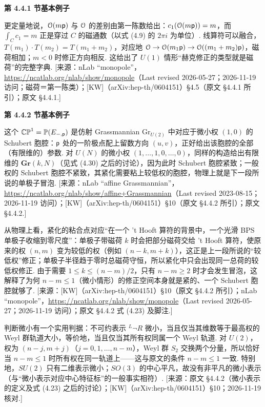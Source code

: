 \medskip\noindent\textbf{第 4.4.1 节\quad 基本例子}\par\nopagebreak
\begin{description}[leftmargin=5.8em,labelwidth=5em,labelsep=0.6em,itemsep=0.15ex,topsep=0.2ex]
\item[4.4.1-1] 更定量地说，${\mathcal O}(m{\sf p})$ 与 ${\mathcal O}$ 的差别由第一陈数给出：$c_1({\mathcal O}(m{\sf p}))=m$，而 $\int_C c_1=m$ 正是穿过 $C$ 的磁通数（以式 (4.9) 的 $2\pi i$ 为单位）. 线算符可以融合，$T(m_1)\cdot T(m_2)=T(m_1+m_2)$，对应地 ${\mathcal O}\to{\mathcal O}(m_1{\sf p})\to{\mathcal O}((m_1+m_2){\sf p})$，磁荷相加；$m<0$ 时修正方向相反. 这给出了 $U(1)$ 情形“赫克修正的类型就是磁荷”的完整字典. [来源：nLab “monopole”，\url{https://ncatlab.org/nlab/show/monopole}（Last revised 2026-05-27；2026-11-19 访问；磁荷＝第一陈类）；[KW]（arXiv:hep-th/0604151）§4.5（原文 §4.4.1 所引）；原文 §4.4.1.]
\end{description}
\medskip\noindent\textbf{第 4.4.2 节\quad 基本例子}\par\nopagebreak
\begin{description}[leftmargin=5.8em,labelwidth=5em,labelsep=0.6em,itemsep=0.15ex,topsep=0.2ex]
\item[4.4.2-1] 这个 ${\mathbb{CP}}^1=\mathbb P(E_{-,{\sf p}})$ 是仿射 Grassmannian $\mathrm{Gr}_{U(2)}$ 中对应于微小权 $(1,0)$ 的 Schubert 胞腔：${\sf p}$ 处的一阶极点配上留数方向 $(u,v)$，正好给出该胞腔的全部（有限维的）参数. 对 $U(N)$ 的微小权 $(1,\dots,1,0,\dots,0)$，同样的构造给出有限维的 $\mathbf{Gr}(k,N)$（见式 (4.30) 之后的讨论），因为此时 Schubert 胞腔紧致；一般权的 Schubert 胞腔不紧致，其紧化需要粘上较低权的胞腔，物理上就是下一段所说的单极子冒泡. [来源：nLab “affine Grassmannian”，\url{https://ncatlab.org/nlab/show/affine+Grassmannian}（Last revised 2023-08-15；2026-11-19 访问）；[KW]（arXiv:hep-th/0604151）§10（原文 §4.4.2 所引）；原文 §4.4.2.]
\item[4.4.2-2] 从物理上看，紧化的粘合点对应“在一个 't Hooft 算符的背景中，一个光滑 BPS 单极子收缩到零尺度”：单极子带磁荷 $k$ 时会把部分磁荷交给 't Hooft 算符，使原来的权 $(n,m)$ 变为较低的权（例如 $(n-k,m+k)$），这正是上一段所说的“较低权”修正；单极子半径趋于零时总磁荷守恒，所以紧化中只会出现同一总荷的较低权修正. 由于需要 $1\le k\le (n-m)/2$，只有 $n-m\ge 2$ 时才会发生冒泡，这解释了为何 $n-m\le 1$（微小情形）的修正空间本身就是紧的、一个 Schubert 胞腔就够了. [来源：[KW]（arXiv:hep-th/0604151）§10（原文 §4.4.2 所引）；nLab “monopole”，\url{https://ncatlab.org/nlab/show/monopole}（Last revised 2026-05-27；2026-11-19 访问）；原文 §4.4.2 式 (4.23) 及脚注.]
\item[4.4.2-3] 判断微小有一个实用判据：不可约表示 $^L\neg R$ 微小，当且仅当其维数等于最高权的 Weyl 群轨道大小，等价地，当且仅当其所有权同属一个 Weyl 轨道. 对 $U(2)$，权为 $(n-j,m+j)$（$j=0,1,\dots,n-m$），Weyl 群 $S_2$ 交换两个分量，所以恰好当 $n-m\le 1$ 时所有权在同一轨道上——这与原文的条件 $n-m\le1$ 一致. 特别地，$SU(2)$ 只有二维表示微小；$SO(3)$ 的中心平凡，故没有非平凡的微小表示（与“微小表示对应中心特征标”的一般事实相符）. [来源：原文 §4.4.2（微小表示的定义及式 (4.23) 之后的讨论）；[KW]（arXiv:hep-th/0604151）§10；2026-11-19 核对.]
\end{description}
